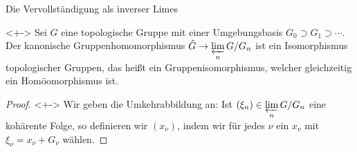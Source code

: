 \begin{frame}{Die Vervollständigung als inverser Limes}
	\begin{proposition}<+->
		Sei \(G\) eine topologische Gruppe mit einer Umgebungsbasis \(G_0 \supset G_1 \supset \dotsb\).
		Der kanonische Gruppenhomomorphismus \(\hat G \to \varprojlim\limits_n G/G_n\) ist ein Isomorphismus
		topologischer Gruppen, das heißt ein Gruppenisomorphismus, welcher gleichzeitig ein Homöomorphismus ist.
	\end{proposition}
	\begin{proof}<+->
		Wir geben die Umkehrabbildung an: Ist \((\xi_n) \in \varprojlim\limits_n G/G_n\) eine kohärente Folge,
		so definieren wir \((x_\nu)\), indem wir für jedes \(\nu\) ein \(x_\nu\) mit \(\xi_\nu = x_\nu + G_\nu\)
		wählen.
	\end{proof}
\end{frame}


